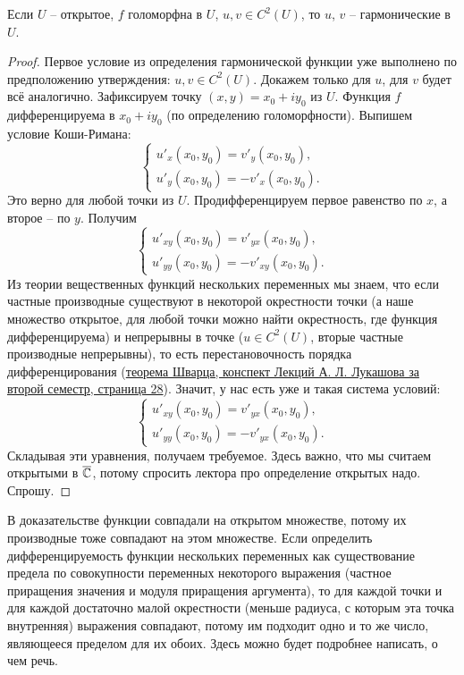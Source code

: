 \begin{proposition}
	Если $U$ -- открытое, $f$ голоморфна в $U$, $u, v \in C^2(U)$, то $u$, $v$ -- гармонические в $U$.
\end{proposition}
\begin{proof}
	Первое условие из определения гармонической функции уже выполнено по предположению утверждения: $u, v \in C^2(U)$. Докажем только для $u$, для $v$ будет всё аналогично. Зафиксируем точку $(x, y) = x_0 + i y_0$ из $U$. Функция $f$ дифференцируема в $x_0 + i y_0$ (по определению голоморфности). Выпишем условие Коши-Римана:
	\[
		\begin{cases}
			{u'}_x(x_0, y_0) = {v'}_{y}(x_0, y_0), \\
			{u'}_y(x_0, y_0) = -{v'}_{x}(x_0, y_0).
		\end{cases}
	\]
	Это верно для любой точки из $U$. Продифференцируем первое равенство по $x$, а второе -- по $y$. Получим
	\[
		\begin{cases}
			{u'}_{xy}(x_0, y_0) = {v'}_{yx}(x_0, y_0), \\
			{u'}_{yy}(x_0, y_0) = -{v'}_{xy}(x_0, y_0).
		\end{cases}
	\]
	Из теории вещественных функций нескольких переменных мы знаем, что если частные производные существуют в некоторой окрестности точки (а наше множество открытое, для любой точки можно найти окрестность, где функция дифференцируема) и непрерывны в точке ($u \in C^2(U)$, вторые частные производные непрерывны), то есть перестановочность порядка дифференцирования (\href{https://docs.yandex.ru/docs/view?url=ya-disk-public%3A%2F%2Fwxhx1QYHiV0ono%2FDz7ZjMLvQDgvtU6E96f8jJk7T%2FdQrDLFzJ7YEtdg%2B37yJNcdEq%2FJ6bpmRyOJonT3VoXnDag%3D%3D%3A%2FLectures%2F2_Semester%2FCalculus%2F2022_Lukashov.pdf&name=2022_Lukashov.pdf}{теорема Шварца, конспект Лекций А. Л. Лукашова за второй семестр, страница 28}). Значит, у нас есть уже и такая система условий:
	\[
		\begin{cases}
			{u'}_{xy}(x_0, y_0) = {v'}_{yx}(x_0, y_0), \\
			{u'}_{yy}(x_0, y_0) = -{v'}_{yx}(x_0, y_0).
		\end{cases}
	\]
	Складывая эти уравнения, получаем требуемое.
	{\color{red} Здесь важно, что мы считаем открытыми в $\overline{\mathbb{C}}$, потому спросить лектора про определение открытых надо. Спрошу.}
\end{proof}
\begin{anote}
	В доказательстве функции совпадали на открытом множестве, потому их производные тоже совпадают на этом множестве. Если определить дифференцируемость функции нескольких переменных как существование предела по совокупности переменных некоторого выражения (частное приращения значения и модуля приращения аргумента), то для каждой точки и для каждой достаточно малой окрестности (меньше радиуса, с которым эта точка внутренняя) выражения совпадают, потому им подходит одно и то же число, являющееся пределом для их обоих. {\color{red} Здесь можно будет подробнее написать, о чем речь.}
\end{anote}

